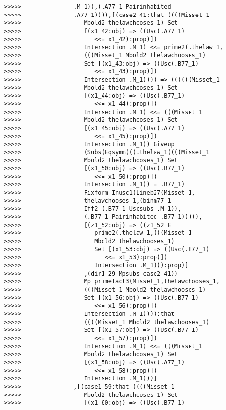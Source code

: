 \documentclass[12pt]{article}
\begin{document}
\begin{verbatim}
>>>>>               .M_1)),(.A77_1 Pairinhabited
>>>>>               .A77_1)))),[(case2_41:that ((((Misset_1
>>>>>                  Mbold2 thelawchooses_1) Set
>>>>>                  [(x1_42:obj) => ((Usc(.A77_1)
>>>>>                     <<= x1_42):prop)])
>>>>>                  Intersection .M_1) <<= prime2(.thelaw_1,
>>>>>                  (((Misset_1 Mbold2 thelawchooses_1)
>>>>>                  Set [(x1_43:obj) => ((Usc(.B77_1)
>>>>>                     <<= x1_43):prop)])
>>>>>                  Intersection .M_1)))) => ((((((Misset_1
>>>>>                  Mbold2 thelawchooses_1) Set
>>>>>                  [(x1_44:obj) => ((Usc(.B77_1)
>>>>>                     <<= x1_44):prop)])
>>>>>                  Intersection .M_1) <<= (((Misset_1
>>>>>                  Mbold2 thelawchooses_1) Set
>>>>>                  [(x1_45:obj) => ((Usc(.A77_1)
>>>>>                     <<= x1_45):prop)])
>>>>>                  Intersection .M_1)) Giveup
>>>>>                  (Subs(Eqsymm(((.thelaw_1((((Misset_1
>>>>>                  Mbold2 thelawchooses_1) Set
>>>>>                  [(x1_50:obj) => ((Usc(.B77_1)
>>>>>                     <<= x1_50):prop)])
>>>>>                  Intersection .M_1)) = .B77_1)
>>>>>                  Fixform Inusc1(Lineb27(Misset_1,
>>>>>                  thelawchooses_1,(binm77_1
>>>>>                  Iff2 (.B77_1 Uscsubs .M_1)),
>>>>>                  (.B77_1 Pairinhabited .B77_1))))),
>>>>>                  [(z1_52:obj) => ((z1_52 E
>>>>>                     prime2(.thelaw_1,(((Misset_1
>>>>>                     Mbold2 thelawchooses_1)
>>>>>                     Set [(x1_53:obj) => ((Usc(.B77_1)
>>>>>                        <<= x1_53):prop)])
>>>>>                     Intersection .M_1))):prop)]
>>>>>                  ,(dir1_29 Mpsubs case2_41))
>>>>>                  Mp primefact3(Misset_1,thelawchooses_1,
>>>>>                  (((Misset_1 Mbold2 thelawchooses_1)
>>>>>                  Set [(x1_56:obj) => ((Usc(.B77_1)
>>>>>                     <<= x1_56):prop)])
>>>>>                  Intersection .M_1)))):that
>>>>>                  ((((Misset_1 Mbold2 thelawchooses_1)
>>>>>                  Set [(x1_57:obj) => ((Usc(.B77_1)
>>>>>                     <<= x1_57):prop)])
>>>>>                  Intersection .M_1) <<= (((Misset_1
>>>>>                  Mbold2 thelawchooses_1) Set
>>>>>                  [(x1_58:obj) => ((Usc(.A77_1)
>>>>>                     <<= x1_58):prop)])
>>>>>                  Intersection .M_1)))]
>>>>>               ,[(case1_59:that ((((Misset_1
>>>>>                  Mbold2 thelawchooses_1) Set
>>>>>                  [(x1_60:obj) => ((Usc(.B77_1)

\end{verbatim}
\end{document}
